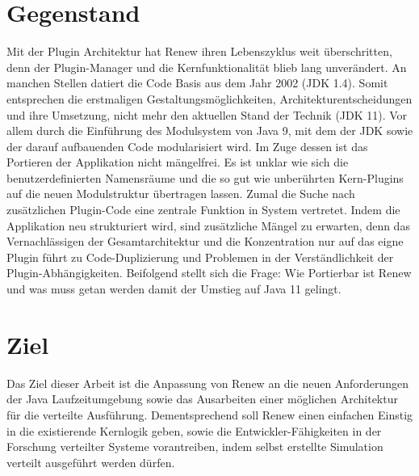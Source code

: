 \section{Gegenstand}
Mit der Plugin Architektur hat Renew ihren Lebenszyklus weit überschritten, denn der Plugin-Manager und die Kernfunktionalität blieb lang unverändert. An manchen Stellen datiert die Code Basis aus dem Jahr 2002 (JDK 1.4). 
Somit entsprechen die erstmaligen Gestaltungsmöglichkeiten, Architekturentscheidungen und ihre Umsetzung, nicht mehr den aktuellen Stand der Technik (JDK 11). Vor allem durch die Einführung des Modulsystem von Java 9, mit dem der JDK sowie der darauf aufbauenden Code modularisiert wird. 
Im Zuge dessen ist das Portieren der Applikation nicht mängelfrei. Es ist unklar wie sich die benutzerdefinierten Namensräume und die so gut wie unberührten Kern-Plugins auf die neuen Modulstruktur übertragen lassen. Zumal die Suche nach zusätzlichen Plugin-Code eine zentrale Funktion in System vertretet.\bigbreak
Indem die Applikation neu strukturiert wird, sind zusätzliche Mängel zu erwarten, denn das Vernachlässigen der Gesamtarchitektur und die Konzentration nur auf das eigne Plugin führt zu Code-Duplizierung und Problemen in der Verständlichkeit der Plugin-Abhängigkeiten.\newline
Beifolgend stellt sich die Frage: Wie Portierbar ist Renew und was muss getan werden damit der Umstieg auf Java 11 gelingt. \bigbreak

\section{Ziel} 
Das Ziel dieser Arbeit ist die Anpassung von Renew an die neuen Anforderungen der Java Laufzeitumgebung sowie das Ausarbeiten einer möglichen Architektur für die verteilte Ausführung. Dementsprechend soll Renew einen einfachen Einstig in die existierende Kernlogik geben, sowie die Entwickler-Fähigkeiten in der Forschung verteilter Systeme vorantreiben, indem  selbst erstellte Simulation verteilt ausgeführt werden dürfen.

